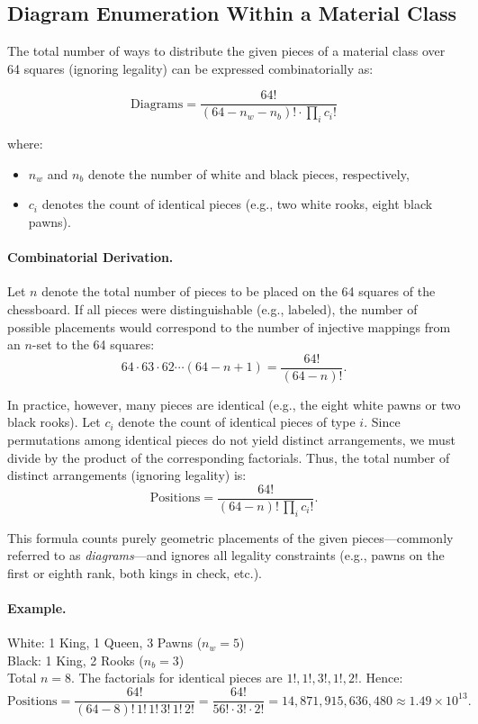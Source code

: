 \documentclass[12pt]{article}
\begin{document}
\subsection{Diagram Enumeration Within a Material Class}

The total number of ways to distribute the given pieces of a material class over 64 squares (ignoring legality) can be expressed combinatorially as:

\[
\text{Diagrams} = \frac{64!}{(64 - n_w - n_b)! \cdot \prod_i c_i!}
\]

where:
\begin{itemize}
\item $n_w$ and $n_b$ denote the number of white and black pieces, respectively,
\item $c_i$ denotes the count of identical pieces (e.g., two white rooks, eight black pawns).
\end{itemize}

\paragraph{Combinatorial Derivation.}
Let \(n\) denote the total number of pieces to be placed on the 64 squares of the chessboard.  
If all pieces were distinguishable (e.g., labeled), the number of possible placements would correspond to the number of injective mappings from an \(n\)-set to the 64 squares:
\[
64 \cdot 63 \cdot 62 \cdots (64 - n + 1) = \frac{64!}{(64 - n)!}.
\]

In practice, however, many pieces are identical (e.g., the eight white pawns or two black rooks).  
Let \(c_i\) denote the count of identical pieces of type \(i\).  
Since permutations among identical pieces do not yield distinct arrangements, we must divide by the product of the corresponding factorials.  
Thus, the total number of distinct arrangements (ignoring legality) is:
\[
\text{Positions} = \frac{64!}{(64 - n)! \, \prod_i c_i!}.
\]

This formula counts purely geometric placements of the given pieces—commonly referred to as \emph{diagrams}—and ignores all legality constraints (e.g., pawns on the first or eighth rank, both kings in check, etc.).

\paragraph{Example.}
White: 1 King, 1 Queen, 3 Pawns (\(n_w = 5\)) \\
Black: 1 King, 2 Rooks (\(n_b = 3\)) \\
Total \(n = 8\).  
The factorials for identical pieces are \(1!, 1!, 3!, 1!, 2!\).  
Hence:
\[
\text{Positions} = \frac{64!}{(64 - 8)! \, 1! \, 1! \, 3! \, 1! \, 2!}
= \frac{64!}{56! \cdot 3! \cdot 2!}
= 14{,}871{,}915{,}636{,}480 \approx 1.49 \times 10^{13}.
\]
\end{document}
